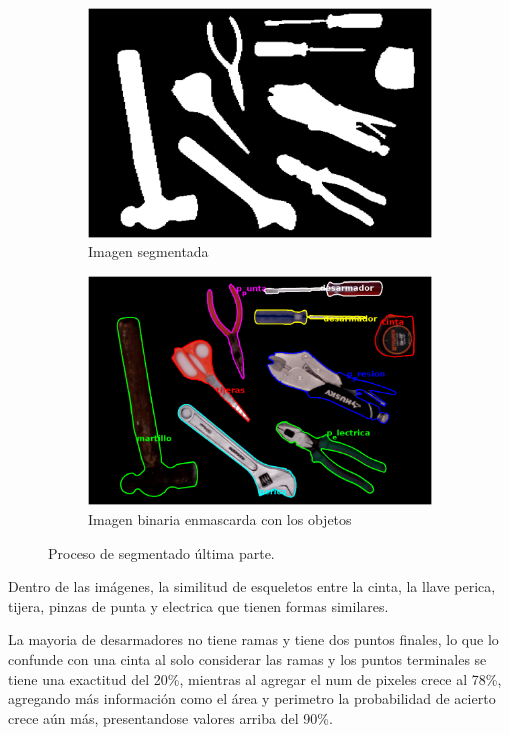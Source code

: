\documentclass[a4paper, 11pt]{article}
\begin{document}
\begin{figure}[h]
  \begin{subfigure}{0.5\linewidth}
    \includegraphics[width=\linewidth]{paso9}
    \caption{Imagen segmentada}
    \label{fig:1a}
  \end{subfigure}\hfill
  \begin{subfigure}{0.5\linewidth}
    \includegraphics[width=\linewidth]{paso10}
    \caption{Imagen binaria enmascarda con los objetos}
    \label{fig:1a}
  \end{subfigure}
  \caption{Proceso de segmentado última parte.}
  \label{fig:1}
\end{figure}

Dentro de las imágenes, la similitud de esqueletos entre la cinta, la llave perica, tijera, pinzas de punta y electrica que tienen formas similares.

La mayoria de desarmadores no tiene ramas y tiene dos puntos finales, lo que lo confunde con una cinta al solo considerar las ramas y los puntos terminales se tiene una exactitud del 20\%, mientras al agregar el num de pixeles crece al 78\%, agregando más información como el área y perimetro la probabilidad de acierto crece aún más, presentandose valores arriba del 90\%.
\end{document}
